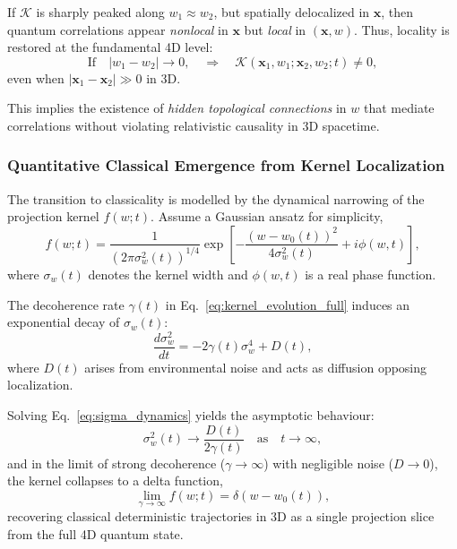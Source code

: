 \documentclass[12pt]{article}
\begin{document}
If $\mathcal{K}$ is sharply peaked along $w_1 \approx w_2$, but spatially delocalized in $\mathbf{x}$, then quantum correlations appear \emph{nonlocal} in $\mathbf{x}$ but \emph{local} in $(\mathbf{x}, w)$. Thus, locality is restored at the fundamental 4D level:
\begin{equation}
    \text{If} \quad |w_1 - w_2| \to 0, \quad \Rightarrow \quad \mathcal{K}(\mathbf{x}_1, w_1; \mathbf{x}_2, w_2; t) \neq 0,
\end{equation}
even when $|\mathbf{x}_1 - \mathbf{x}_2| \gg 0$ in 3D.

This implies the existence of \emph{hidden topological connections} in $w$ that mediate correlations without violating relativistic causality in 3D spacetime.

\vspace{1em}
\subsubsection*{Quantitative Classical Emergence from Kernel Localization}

The transition to classicality is modelled by the dynamical narrowing of the projection kernel $f(w; t)$. Assume a Gaussian ansatz for simplicity,
\begin{equation}
    f(w; t) = \frac{1}{(2\pi \sigma_w^2(t))^{1/4}} \exp \left[- \frac{(w - w_0(t))^2}{4 \sigma_w^2(t)} + i \phi(w, t) \right],
    \label{eq:gaussian_kernel_phase}
\end{equation}
where $\sigma_w(t)$ denotes the kernel width and $\phi(w, t)$ is a real phase function.

The decoherence rate $\gamma(t)$ in Eq.~\eqref{eq:kernel_evolution_full} induces an exponential decay of $\sigma_w(t)$:
\begin{equation}
    \frac{d\sigma_w^2}{dt} = - 2 \gamma(t) \sigma_w^4 + D(t),
    \label{eq:sigma_dynamics}
\end{equation}
where $D(t)$ arises from environmental noise and acts as diffusion opposing localization.

Solving Eq.~\eqref{eq:sigma_dynamics} yields the asymptotic behaviour:
\begin{equation}
    \sigma_w^2(t) \to \frac{D(t)}{2 \gamma(t)} \quad \text{as} \quad t \to \infty,
\end{equation}
and in the limit of strong decoherence ($\gamma \to \infty$) with negligible noise ($D \to 0$), the kernel collapses to a delta function,
\begin{equation}
    \lim_{\gamma \to \infty} f(w; t) = \delta(w - w_0(t)),
\end{equation}
recovering classical deterministic trajectories in 3D as a single projection slice from the full 4D quantum state.
\end{document}
